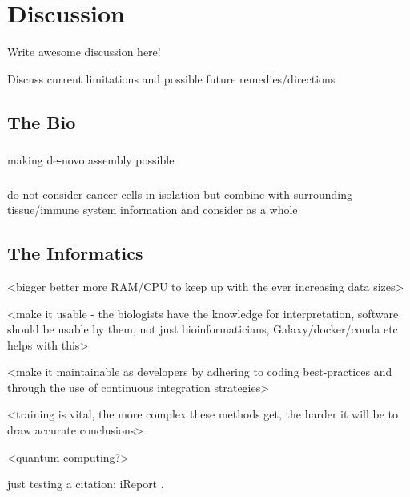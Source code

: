 \chapter{Discussion}
\label{discussion}

Write awesome discussion here!

Discuss current limitations and possible future remedies/directions

\section{The Bio}

\subsection{\color{midgrey}{Single-cell Sequencing}}

\subsection{\color{midgrey}{Ultra-long high-quality reads}}
making de-novo assembly possible

\subsection{\color{midgrey}{Environment}}
do not consider cancer cells in isolation but combine with surrounding tissue/immune system information and consider as a whole


\section{The Informatics}

<bigger better more RAM/CPU to keep up with the ever increasing data sizes>

<make it usable - the biologists have the knowledge for interpretation, software should be usable by them, not just bioinformaticians, Galaxy/docker/conda etc helps with this>

<make it maintainable as developers by adhering to coding best-practices and through the use of continuous integration strategies>

<training is vital, the more complex these methods get, the harder it will be to draw accurate conclusions>

<quantum computing?>

just testing a citation: iReport \cite{ireport}.



